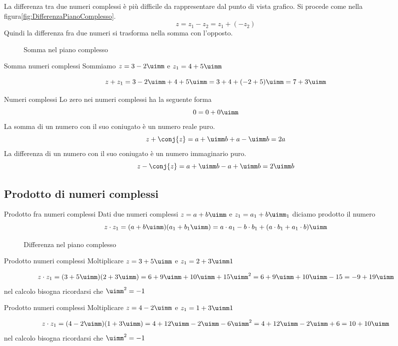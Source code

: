 La differenza tra due numeri complessi è più difficile da rappresentare  dal punto di vista grafico. Si procede come nella figura\nobs\vref{fig:DifferenzaPianoComplesso}. \[ z=z_1-z_2=z_1+(-z_2)\]  Quindi la differenza fra due numeri si trasforma nella somma con l'opposto.
\begin{figure}
	\centering
	
	\caption{Somma nel piano complesso}
	\label{fig:sommaPianoComplesso}
\end{figure}
\begin{esempiot}{Somma numeri complessi}{}
Sommiamo $z=3-2\uimm$ e $z_1=4+5\uimm$
\end{esempiot}
	\[z+z_1=3-2\uimm +4+5\uimm=3+4+(-2+5)\uimm=7+3\uimm\]
	\begin{osservazionet}{Numeri complessi}{}
	Lo zero nei numeri complessi ha la seguente forma
	\[0=0+0\uimm\]
	La somma di un numero con il suo coniugato è un numero reale puro. \[z+\conj{z}=a+\uimm b+a-\uimm b=2a \] 
	La differenza di un numero con il suo coniugato è un numero immaginario puro. \[z-\conj{z}=a+\uimm b-a+\uimm b=2\uimm b \] 
	\end{osservazionet}
\subsection{Prodotto di numeri complessi}
\begin{definizionet}{Prodotto fra numeri complessi}{}
	Dati due numeri complessi  $z=a+b\uimm $ e  $z_1=a_1+b\uimm _1$ diciamo prodotto il numero \[z\cdot z_1=(a+b\uimm)(a_1+b_1\uimm)=a\cdot a_1-b\cdot b_1+(a\cdot b_1+a_1\cdot b)\uimm\]
\end{definizionet}
\begin{figure}
	\centering
	
	\caption{Differenza nel piano complesso}
	\label{fig:DifferenzaPianoComplesso}
\end{figure}
\begin{esempiot}{Prodotto numeri complessi}{}
	Moltiplicare $z=3+5\uimm $ e  $z_1=2+3\uimm1$ 
\end{esempiot}	
	 \[z\cdot z_1=(3+5\uimm)(2+3\uimm)= 6+9\uimm +10\uimm +15\uimm^2=6+9\uimm +10\uimm -15 =-9+19\uimm \]
	nel calcolo bisogna ricordarsi che $\uimm^2=-1$
\begin{esempiot}{Prodotto numeri complessi}{}
	Moltiplicare $z=4-2\uimm $ e  $z_1=1+3\uimm1$  
\end{esempiot}	
	\[z\cdot z_1=(4-2\uimm)(1+3\uimm)= 4+12\uimm -2\uimm -6\uimm^2= 4+12\uimm -2\uimm +6=10+10\uimm \]
	nel calcolo bisogna ricordarsi che $\uimm^2=-1$

